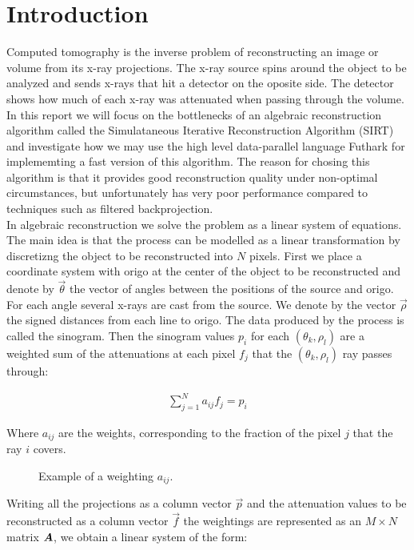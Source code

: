 \section{Introduction}
Computed tomography is the inverse problem of reconstructing an image or volume from its x-ray projections. The x-ray source spins around the object to be analyzed and sends x-rays that hit a detector on the oposite side. The detector shows how much of each x-ray was attenuated when passing through the volume. In this report we will focus on the bottlenecks of an algebraic reconstruction algorithm called the Simulataneous Iterative Reconstruction Algorithm (SIRT) and investigate how we may use the high level data-parallel language Futhark for implememting a fast version of this algorithm. The reason for chosing this algorithm is that it provides good reconstruction quality under non-optimal circumstances, but unfortunately has very poor performance compared to techniques such as filtered backprojection.\\
In algebraic reconstruction we solve the problem as a linear system of equations. The main idea is that the process can be modelled as a linear transformation by discretizng the object to be reconstructed into $N$ pixels. First we place a coordinate system with origo at the center of the object to be reconstructed and denote by $\vec{\theta}$ the vector of angles between the positions of the source and origo. For each angle several x-rays are cast from the source. We denote by the vector $\vec{\rho}$ the signed distances from each line to origo. The data produced by the process is called the sinogram. Then the sinogram values $p_i$ for each $(\theta_k,\rho_l)$  are a weighted sum of the attenuations at each pixel $f_j$ that the $(\theta_k,\rho_l)$ ray passes through:

\begin{align}
\sum_{j=1}^N a_{ij}f_j=p_i
\end{align}

Where $a_{ij}$ are the weights, corresponding to the fraction of the pixel $j$ that the ray $i$ covers.

\begin{figure}
\centering
{}
\caption{Example of a weighting $a_{ij}$.}
\label{fig:weightings}
\end{figure}
Writing all the projections as a column vector $\vec{p}$ and the attenuation values to be reconstructed as a column vector $\vec{f}$ the weightings are represented as an $M\times N$ matrix $\mat{A}$, we obtain a linear system of the form:

